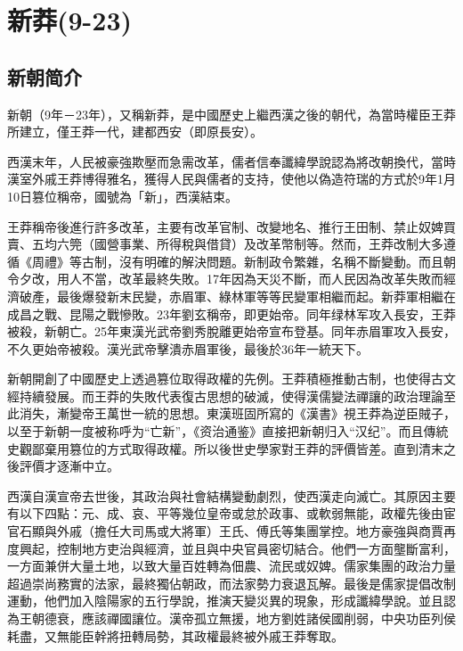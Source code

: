 
\section{新莽\tiny(9-23)}

\subsection{新朝简介}

新朝（9年－23年），又稱新莽，是中國歷史上繼西漢之後的朝代，為當時權臣王莽所建立，僅王莽一代，建都西安（即原長安）。

西漢末年，人民被豪強欺壓而急需改革，儒者信奉讖緯學說認為將改朝換代，當時漢室外戚王莽博得雅名，獲得人民與儒者的支持，使他以偽造符瑞的方式於9年1月10日篡位稱帝，國號為「新」，西漢結束。

王莽稱帝後進行許多改革，主要有改革官制、改變地名、推行王田制、禁止奴婢買賣、五均六筦（國營事業、所得稅與借貸）及改革幣制等。然而，王莽改制大多遵循《周禮》等古制，沒有明確的解決問題。新制政令繁雜，名稱不斷變動。而且朝令夕改，用人不當，改革最終失敗。17年因為天災不斷，而人民因為改革失敗而經濟破產，最後爆發新末民變，赤眉軍、綠林軍等等民變軍相繼而起。新莽軍相繼在成昌之戰、昆陽之戰慘敗。23年劉玄稱帝，即更始帝。同年绿林军攻入長安，王莽被殺，新朝亡。25年東漢光武帝劉秀脫離更始帝宣布登基。同年赤眉軍攻入長安，不久更始帝被殺。漢光武帝擊潰赤眉軍後，最後於36年一統天下。

新朝開創了中國歷史上透過篡位取得政權的先例。王莽積極推動古制，也使得古文經持續發展。而王莽的失敗代表復古思想的破滅，使得漢儒變法禪讓的政治理論至此消失，漸變帝王萬世一統的思想。東漢班固所寫的《漢書》視王莽為逆臣賊子，以至于新朝一度被称呼为“亡新”，《资治通鉴》直接把新朝归入“汉纪”。而且傳統史觀鄙棄用篡位的方式取得政權。所以後世史學家對王莽的評價皆差。直到清末之後評價才逐漸中立。

西漢自漢宣帝去世後，其政治與社會結構變動劇烈，使西漢走向滅亡。其原因主要有以下四點：元、成、哀、平等幾位皇帝或怠於政事、或軟弱無能，政權先後由宦官石顯與外戚（擔任大司馬或大將軍）王氏、傅氏等集團掌控。地方豪強與商賈再度興起，控制地方吏治與經濟，並且與中央官員密切結合。他們一方面壟斷富利，一方面兼併大量土地，以致大量百姓轉為佃農、流民或奴婢。儒家集團的政治力量超過崇尚務實的法家，最終獨佔朝政，而法家勢力衰退瓦解。最後是儒家提倡改制運動，他們加入陰陽家的五行學說，推演天變災異的現象，形成讖緯學說。並且認為王朝德衰，應該禪國讓位。漢帝孤立無援，地方劉姓諸侯國削弱，中央功臣列侯耗盡，又無能臣幹將扭轉局勢，其政權最終被外戚王莽奪取。

